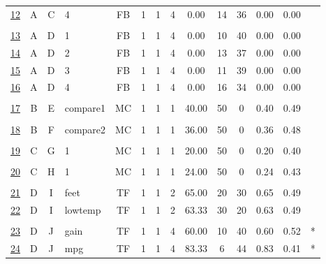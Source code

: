 \documentclass[12pt,english,nohyper]{tufte-handout}\usepackage[]{graphicx}\usepackage[]{color}
\begin{document}
\begin{longtable}{cccl|cccc|ccccc|l}
  \hyperlink{T06.A.C.04.1.1.FB.4.2}{12} & A & C & 4 & FB &   1 &   1 &   4 & 0.00 &  14 &  36 & 0.00 & 0.00 &  \\ 
   &  &  &  &  &  &  &  &  &  &  &  &  &  \\ 
  \hyperlink{T06.A.D.04.1.1.FB.1.2}{13} & A & D & 1 & FB &   1 &   1 &   4 & 0.00 &  10 &  40 & 0.00 & 0.00 &  \\ 
  \hyperlink{T06.A.D.04.1.1.FB.2.2}{14} & A & D & 2 & FB &   1 &   1 &   4 & 0.00 &  13 &  37 & 0.00 & 0.00 &  \\ 
  \hyperlink{T06.A.D.04.1.1.FB.3.2}{15} & A & D & 3 & FB &   1 &   1 &   4 & 0.00 &  11 &  39 & 0.00 & 0.00 &  \\ 
  \hyperlink{T06.A.D.04.1.1.FB.4.2}{16} & A & D & 4 & FB &   1 &   1 &   4 & 0.00 &  16 &  34 & 0.00 & 0.00 &  \\ 
   &  &  &  &  &  &  &  &  &  &  &  &  &  \\ 
  \hyperlink{T06.B.E.01.1.1.MC.compare1.2}{17} & B & E & compare1 & MC &   1 &   1 &   1 & 40.00 &  50 &   0 & 0.40 & 0.49 &  \\ 
   &  &  &  &  &  &  &  &  &  &  &  &  &  \\ 
  \hyperlink{T06.B.F.01.1.1.MC.compare2.2}{18} & B & F & compare2 & MC &   1 &   1 &   1 & 36.00 &  50 &   0 & 0.36 & 0.48 &  \\ 
   &  &  &  &  &  &  &  &  &  &  &  &  &  \\ 
  \hyperlink{T06.C.G.01.1.1.MC.1.2}{19} & C & G & 1 & MC &   1 &   1 &   1 & 20.00 &  50 &   0 & 0.20 & 0.40 &  \\ 
   &  &  &  &  &  &  &  &  &  &  &  &  &  \\ 
  \hyperlink{T06.C.H.01.1.1.MC.1.2}{20} & C & H & 1 & MC &   1 &   1 &   1 & 24.00 &  50 &   0 & 0.24 & 0.43 &  \\ 
   &  &  &  &  &  &  &  &  &  &  &  &  &  \\ 
  \hyperlink{T06.D.I.02.1.1.TF.feet.2}{21} & D & I & feet & TF &   1 &   1 &   2 & 65.00 &  20 &  30 & 0.65 & 0.49 &  \\ 
  \hyperlink{T06.D.I.02.1.1.TF.lowtemp.2}{22} & D & I & lowtemp & TF &   1 &   1 &   2 & 63.33 &  30 &  20 & 0.63 & 0.49 &  \\ 
   &  &  &  &  &  &  &  &  &  &  &  &  &  \\ 
  \hyperlink{T06.D.J.04.1.1.TF.gain.2}{23} & D & J & gain & TF &   1 &   1 &   4 & 60.00 &  10 &  40 & 0.60 & 0.52 & * \\ 
  \hyperlink{T06.D.J.04.1.1.TF.mpg.2}{24} & D & J & mpg & TF &   1 &   1 &   4 & 83.33 &   6 &  44 & 0.83 & 0.41 & * \\ 

\end{longtable}
\end{document}
